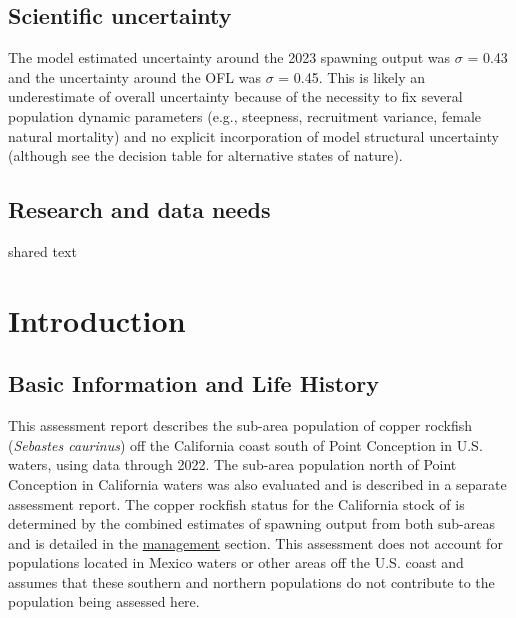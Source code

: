 \documentclass[11pt,
  english,
  letterpaper,
]{article}
\begin{document}
\hypertarget{scientific-uncertainty}{%
\subsection*{Scientific uncertainty}\label{scientific-uncertainty}}

The model estimated uncertainty around the 2023 spawning output was \(\sigma\) = 0.43 and the uncertainty around the OFL was \(\sigma\) = 0.45. This is likely an underestimate of overall uncertainty because of the necessity to fix several population dynamic parameters (e.g., steepness, recruitment variance, female natural mortality) and no explicit incorporation of model structural uncertainty (although see the decision table for alternative states of nature).

\hypertarget{research-and-data-needs}{%
\subsection*{Research and data needs}\label{research-and-data-needs}}

shared text

\pagebreak
\setlength{\parskip}{5mm plus1mm minus1mm}
\setcounter{page}{1}
\renewcommand{\thefigure}{\arabic{figure}}
\renewcommand{\thetable}{\arabic{table}}
\setcounter{table}{0}
\setcounter{figure}{0}

\hypertarget{introduction}{%
\section{Introduction}\label{introduction}}

\hypertarget{basic-information-and-life-history}{%
\subsection{Basic Information and Life History}\label{basic-information-and-life-history}}

This assessment report describes the sub-area population of copper rockfish (\emph{Sebastes caurinus}) off the California coast south of Point Conception in U.S. waters, using data through 2022. The sub-area population north of Point Conception in California waters was also evaluated and is described in a separate assessment report. The copper rockfish status for the California stock of is determined by the combined estimates of spawning output from both sub-areas and is detailed in the \protect\hyperlink{management}{management} section. This assessment does not account for populations located in Mexico waters or other areas off the U.S. coast and assumes that these southern and northern populations do not contribute to the population being assessed here.
\end{document}

